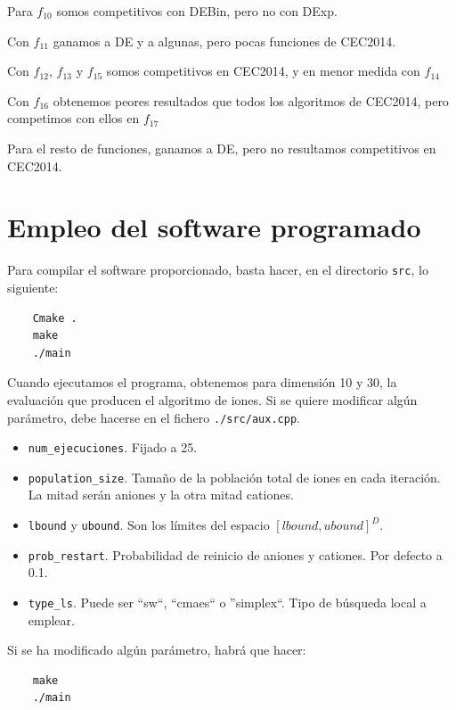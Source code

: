 \documentclass[a4paper,11pt]{article}
\begin{document}
\begin{itemize}
  Para $f_{10}$ somos competitivos con DEBin, pero no con DExp.
  
  Con $f_{11}$ ganamos a DE y a algunas, pero pocas funciones de CEC2014.
  
  Con $f_{12}$, $f_{13}$ y $f_{15}$ somos competitivos en CEC2014, y en menor medida con $f_{14}$
  
  Con $f_{16}$ obtenemos peores resultados que todos los algoritmos de CEC2014, pero competimos con ellos en $f_{17}$
  
  Para el resto de funciones, ganamos a DE, pero no resultamos competitivos en CEC2014.
  
\end{itemize}



\section{Empleo del software programado}

Para compilar el software proporcionado, basta hacer, en el directorio \texttt{src}, lo siguiente:

\begin{verbatim}
    Cmake .
    make
    ./main
\end{verbatim}

Cuando ejecutamos el programa, obtenemos para dimensión 10 y 30, la evaluación que producen el algoritmo de iones.
Si se quiere modificar algún parámetro, debe hacerse en el fichero \texttt{./src/aux.cpp}. 

\begin{itemize}
 \item \texttt{num\_ejecuciones}. Fijado a 25.
 \item \texttt{population\_size}. Tamaño de la población total de iones en cada iteración. La mitad serán aniones y la otra
 mitad cationes.
 \item \texttt{lbound} y \texttt{ubound}. Son los límites del espacio $[lbound, ubound]^D$.
 \item \texttt{prob\_restart}. Probabilidad de reinicio de aniones y cationes. Por defecto a 0.1.
 \item \texttt{type\_ls}. Puede ser ``sw``, ``cmaes`` o ''simplex``. Tipo de búsqueda local a emplear.
\end{itemize}

Si se ha modificado algún parámetro, habrá que hacer:
\begin{verbatim}
    make
    ./main
\end{verbatim}
\end{document}
